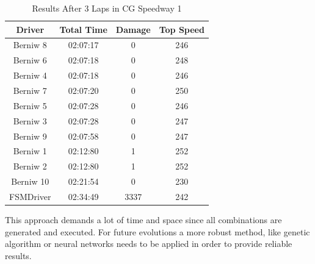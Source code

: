 \begin{table}[h]
\renewcommand{\arraystretch}{1.3}
\caption{Results After 3 Laps in CG Speedway 1}
\label{table_results_CG}
\centering

\begin{tabular}{c||c||c||c}
\hline \bfseries Driver &\bfseries Total Time &\bfseries Damage &\bfseries Top Speed \\
\hline
\hline Berniw 8 & 02:07:17 & 0 & 246 \\
\hline Berniw 6 & 02:07:18 & 0 & 248 \\
\hline Berniw 4 & 02:07:18 & 0 & 246 \\
\hline Berniw 7 & 02:07:20 & 0 & 250 \\
\hline Berniw 5 & 02:07:28 & 0 & 246 \\
\hline Berniw 3 & 02:07:28 & 0 & 247 \\
\hline Berniw 9 & 02:07:58 & 0 & 247 \\
\hline Berniw 1 & 02:12:80 & 1 & 252 \\
\hline Berniw 2 & 02:12:80 & 1 & 252 \\
\hline Berniw 10 & 02:21:54 & 0 & 230 \\
\hline FSMDriver & 02:34:49 & 3337 & 242 \\ 
\hline 
\end{tabular}
\end{table}
This approach demands a lot of time and space since all combinations are generated and executed. For future evolutions a more robust method, like genetic algorithm or neural networks needs to be applied in order to provide reliable results.
